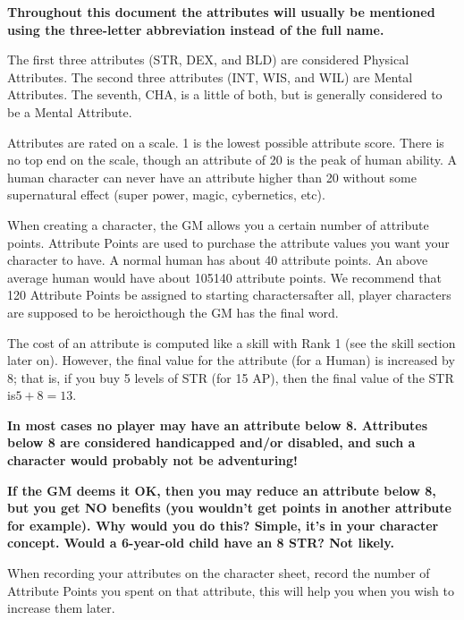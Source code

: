 \documentclass[twoside]{book}
\begin{document}
 \textbf{Throughout this document the attributes will usually be mentioned using the three-letter abbreviation instead of the full name.}


    {  
    The first three attributes (STR, DEX, and BLD) are considered Physical Attributes. The second three attributes (INT, WIS, and WIL) are Mental Attributes. The seventh, CHA, is a little of both, but is generally considered to be a Mental Attribute.
    }
  
    {  
    Attributes are rated on a scale. 1 is the lowest possible attribute score. There is no top end on the scale, though an attribute of 20 is the peak of human ability. A human character can never have an attribute higher than 20 without some supernatural effect (super power, magic, cybernetics, etc).
    }
  
    {  
    When creating a character, the GM allows you a certain number of attribute points. Attribute Points are used to purchase the attribute values you want your character to have. A normal human has about 40 attribute points. An above average human would have about 105140 attribute points. We recommend that 120 Attribute Points be assigned to starting charactersafter all, player characters are supposed to be heroicthough the GM has the final word.
    }
  
    {  
    The cost of an attribute is computed like a skill with Rank 1 (see the skill section later on). However, the final value for the attribute (for a Human) is increased by 8; that is, if you buy 5 levels of STR (for 15 AP), then the final value of the STR is\begin{math}5+8=13\end{math}.
    }
  

 \textbf{In most cases no player may have an attribute below 8. Attributes below 8 are considered handicapped and/or disabled, and such a character would probably not be adventuring!}



 \textbf{If the GM deems it OK, then you may reduce an attribute below 8, but you get NO benefits (you wouldn't get points in another attribute for example). Why would you do this? Simple, it's in your character concept. Would a 6-year-old child have an 8 STR? Not likely.}


    {  
    When recording your attributes on the character sheet, record the number of Attribute Points you spent on that attribute, this will help you when you wish to increase them later.
    }
  
\end{document}
